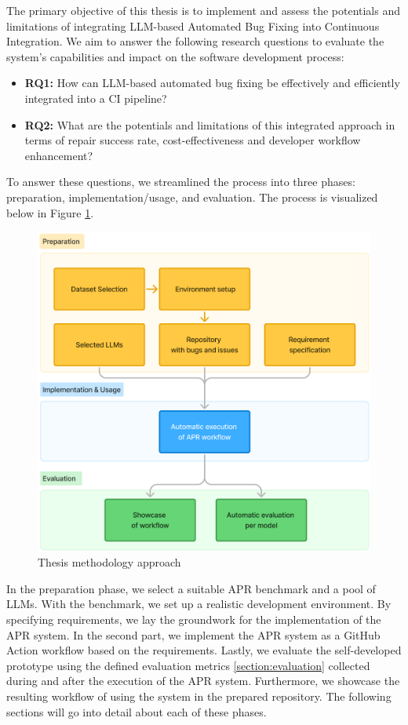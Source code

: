 The primary objective of this thesis is to implement and assess the potentials and limitations of integrating LLM-based Automated Bug Fixing into Continuous Integration. We aim to answer the following research questions to evaluate the system's capabilities and impact on the software development process:

\begin{itemize}
    \item \textbf{RQ1:} How can LLM-based automated bug fixing be effectively and efficiently integrated into a CI pipeline?
    \item \textbf{RQ2:} What are the potentials and limitations of this integrated approach in terms of repair success rate, cost-effectiveness and developer workflow enhancement?
\end{itemize}

To answer these questions, we streamlined the process into three phases: preparation, implementation/usage, and evaluation. The process is visualized below in Figure \ref{fig:method-overview}.

\begin{figure}[H]
    \centering
    \includegraphics[width=1\textwidth]{images/flowcharts/method.png}
    \caption{Thesis methodology approach}
    \label{fig:method-overview}
\end{figure}

In the preparation phase, we select a suitable APR benchmark and a pool of \acp{LLM}. With the benchmark, we set up a realistic development environment. By specifying requirements, we lay the groundwork for the implementation of the APR system.
In the second part, we implement the APR system as a GitHub Action workflow based on the requirements.
Lastly, we evaluate the self-developed prototype using the defined evaluation metrics \ref{section:evaluation} collected during and after the execution of the APR system. Furthermore, we showcase the resulting workflow of using the system in the prepared repository.
The following sections will go into detail about each of these phases.

